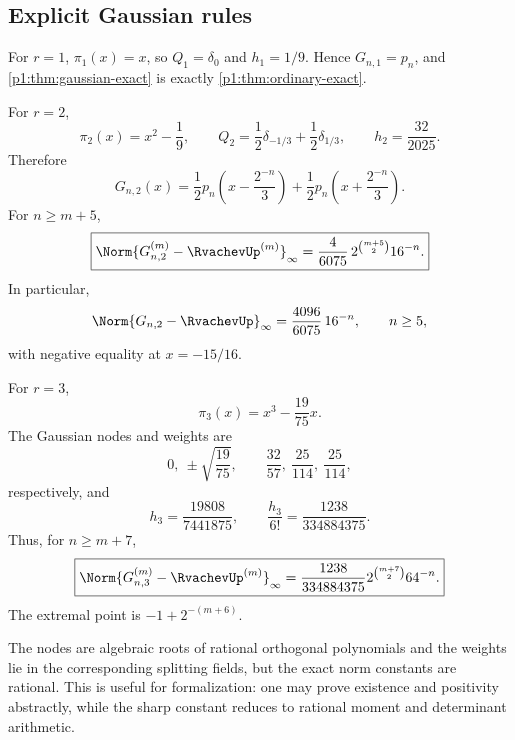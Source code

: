 \documentclass[11pt]{article}
\numberwithin{equation}{section}
\theoremstyle{definition}
\theoremstyle{remark}
\begin{document}
\subsection{Explicit Gaussian rules}

\begin{example}
For $r=1$, $\pi_1(x)=x$, so $Q_1=\delta_0$ and $h_1=1/9$.  Hence $G_{n,1}=p_n$, and \cref{p1:thm:gaussian-exact} is exactly \cref{p1:thm:ordinary-exact}.
\end{example}

\begin{example}
For $r=2$,
\[
 \pi_2(x)=x^2-\frac19,
 \qquad
 Q_2=\frac12\delta_{-1/3}+\frac12\delta_{1/3},
 \qquad
 h_2=\frac{32}{2025}.
\]
Therefore
\begin{equation}
 \boxed{
 G_{n,2}(x)=\frac12p_n\!\left(x-\frac{2^{-n}}3\right)
 +\frac12p_n\!\left(x+\frac{2^{-n}}3\right).}
 \label{p1:eq:Gn2}
\end{equation}
For $n\ge m+5$,
\begin{equation}
 \boxed{
 \Norm{G_{n,2}^{(m)}-\RvachevUp^{(m)}}_\infty
 =\frac4{6075}\,2^{\binom{m+5}{2}}16^{-n}.}
 \label{p1:eq:Gn2-error}
\end{equation}
In particular,
\begin{equation}
 \Norm{G_{n,2}-\RvachevUp}_\infty
 =\frac{4096}{6075}\,16^{-n},
 \qquad n\ge5,
 \label{p1:eq:Gn2-uniform}
\end{equation}
with negative equality at $x=-15/16$.
\end{example}

\begin{example}
For $r=3$,
\[
 \pi_3(x)=x^3-\frac{19}{75}x.
\]
The Gaussian nodes and weights are
\begin{equation}
 0,\ \pm\sqrt{\frac{19}{75}},
 \qquad
 \frac{32}{57},\ \frac{25}{114},\ \frac{25}{114},
 \label{p1:eq:G3-nodes-weights}
\end{equation}
respectively, and
\[
 h_3=\frac{19808}{7441875},
 \qquad
 \frac{h_3}{6!}=\frac{1238}{334884375}.
\]
Thus, for $n\ge m+7$,
\begin{equation}
 \boxed{
 \Norm{G_{n,3}^{(m)}-\RvachevUp^{(m)}}_\infty
 =\frac{1238}{334884375}
 2^{\binom{m+7}{2}}64^{-n}.}
 \label{p1:eq:Gn3-error}
\end{equation}
The extremal point is $-1+2^{-(m+6)}$.
\end{example}

\begin{remark}
The nodes are algebraic roots of rational orthogonal polynomials and the weights lie in the corresponding splitting fields, but the exact norm constants are rational.  This is useful for formalization: one may prove existence and positivity abstractly, while the sharp constant reduces to rational moment and determinant arithmetic.
\end{remark}
\end{document}
